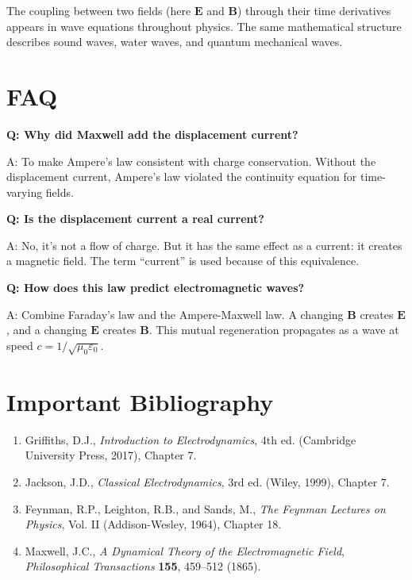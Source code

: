 The coupling between two fields (here $\mathbf{E}$ and $\mathbf{B}$) through their time derivatives appears in wave equations throughout physics. The same mathematical structure describes sound waves, water waves, and quantum mechanical waves.

\section*{FAQ}

\textbf{Q: Why did Maxwell add the displacement current?}

A: To make Ampere's law consistent with charge conservation. Without the displacement current, Ampere's law violated the continuity equation for time-varying fields.

\textbf{Q: Is the displacement current a real current?}

A: No, it's not a flow of charge. But it has the same effect as a current: it creates a magnetic field. The term ``current'' is used because of this equivalence.

\textbf{Q: How does this law predict electromagnetic waves?}

A: Combine Faraday's law and the Ampere-Maxwell law. A changing $\mathbf{B}$ creates $\mathbf{E}$, and a changing $\mathbf{E}$ creates $\mathbf{B}$. This mutual regeneration propagates as a wave at speed $c = 1/\sqrt{\mu_0 \varepsilon_0}$.

\section*{Important Bibliography}

\begin{enumerate}
\item Griffiths, D.J., \textit{Introduction to Electrodynamics}, 4th ed. (Cambridge University Press, 2017), Chapter 7.
\item Jackson, J.D., \textit{Classical Electrodynamics}, 3rd ed. (Wiley, 1999), Chapter 7.
\item Feynman, R.P., Leighton, R.B., and Sands, M., \textit{The Feynman Lectures on Physics}, Vol. II (Addison-Wesley, 1964), Chapter 18.
\item Maxwell, J.C., \textit{A Dynamical Theory of the Electromagnetic Field}, \textit{Philosophical Transactions} \textbf{155}, 459--512 (1865).
\end{enumerate}
